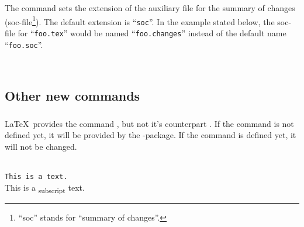 \begin{chusage}
		\>\\
	\usageexample
		\>\\
		\>
\end{chusage}



\subsubsection{}
\DescribeMacro{\setsocextension}

The command  sets the extension of the auxiliary file for the summary of changes (soc-file\footnote{%
	``soc'' stands for ``summary of changes''.
}).
The default extension is ``\texttt{soc}''.
In the example stated below, the soc-file for ``\texttt{foo.tex}'' would be named ``\texttt{foo.changes}'' instead of the default name ``\texttt{foo.soc}''.

\begin{chusage}
		\>\\
	\usageexample
		\>
\end{chusage}



\subsection{Other new commands}
\label{sec:user:other}

\subsubsection{}
\DescribeMacro{\textsubscript}

\LaTeX\ provides the command , but not it's counterpart .
If the command is not defined yet, it will be provided by the -package.
If the command is defined yet, it will not be changed.
\begin{chusage}
		\>\\
	\usageexample
		\>\texttt{This is a  text.}\\
		\>This is a \textsubscript{subscript} text.
\end{chusage}


